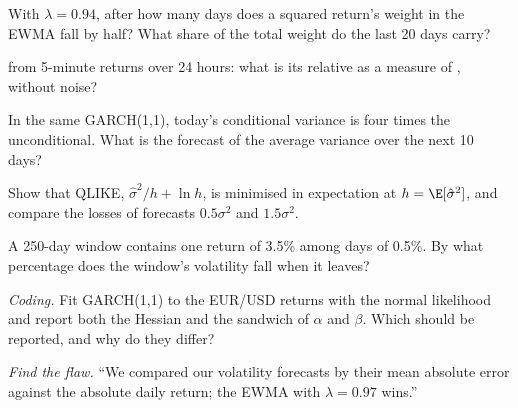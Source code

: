 \begin{exercise}[$\star$]\label{exo:qm:volatility-models:2}
With $\lambda = 0.94$, after how many days does a squared return's weight in the EWMA fall by half? What share of the total weight do the last 20 days carry?
\end{exercise}

\begin{exercise}[$\star$]\label{exo:qm:volatility-models:3}
 from 5-minute returns over 24 hours: what is its relative  as a measure of , without noise?
\end{exercise}

\begin{exercise}[$\star\star$]\label{exo:qm:volatility-models:4}
In the same GARCH(1,1), today's conditional variance is four times the unconditional. What is the forecast of the average variance over the next 10 days?
\end{exercise}

\begin{exercise}[$\star\star$]\label{exo:qm:volatility-models:5}
Show that QLIKE, $\hat\sigma^2/h + \ln h$, is minimised in expectation at $h = \E[\hat\sigma^2]$, and compare the losses of forecasts $0.5\sigma^2$ and $1.5\sigma^2$.
\end{exercise}

\begin{exercise}[$\star\star$]\label{exo:qm:volatility-models:6}
A 250-day window contains one return of 3.5\% among days of 0.5\%. By what percentage does the window's volatility fall when it leaves?
\end{exercise}

\begin{exercise}[$\star\star\star$]\label{exo:qm:volatility-models:7}
\emph{Coding.} Fit GARCH(1,1) to the EUR/USD returns with the normal likelihood and report both the Hessian and the sandwich  of
$\alpha$ and $\beta$. Which should be reported, and why do they differ?
\end{exercise}

\begin{exercise}[$\star\star\star$]\label{exo:qm:volatility-models:8}
\emph{Find the flaw.} ``We compared our volatility forecasts by their mean absolute error against the absolute daily return; the EWMA with $\lambda = 0.97$ wins.''
\end{exercise}

